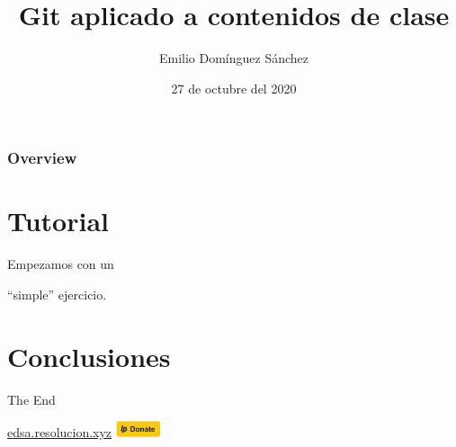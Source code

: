 \documentclass{beamer}
\title{Git aplicado a contenidos de clase} %
\author{Emilio Domínguez Sánchez} %
\institute[UM] %
{
University of Murcia \\ %
\medskip
\textit{emilio.dominguezs@um.es} %
}
\date{27 de octubre del 2020} %
\begin{document}
\begin{frame}
\titlepage
\end{frame}

\begin{frame}
\frametitle{Overview}
\tableofcontents
\end{frame}



\section{Tutorial}

\begin{frame}
\begin{center}
    \Huge
    Empezamos con un

    ``simple'' ejercicio.
\end{center}
\end{frame}







\section*{Conclusiones}

\begin{frame}
\begin{center}
    \Huge
    The End
\end{center}

\vspace{5cm}

\url{edsa.resolucion.xyz}
\hfill
\href{https://liberapay.com/useredsa/donate}{\includegraphics[width=1.3cm]{images/liberapay-donate-button.png}}
\end{frame}

\end{document}
